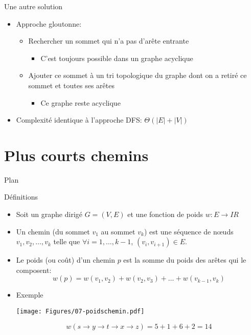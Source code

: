 \begin{frame}{Une autre solution}

\begin{itemize}
\item Approche gloutonne:
\begin{itemize}
\item Rechercher un sommet qui n'a pas d'arête entrante
\begin{itemize}
\item C'est toujours possible dans un graphe acyclique
\end{itemize}
\item Ajouter ce sommet à un tri topologique du graphe dont on a retiré ce sommet et toutes ses arêtes
\begin{itemize}
\item Ce graphe reste acyclique
\end{itemize}
\end{itemize}
\item Complexité identique à l'approche DFS: $\Theta(|E|+|V|)$
\end{itemize}

\end{frame}


\section{Plus courts chemins}

\begin{frame}{Plan}

\tableofcontents[currentsection]

\end{frame}


\begin{frame}{Définitions}

\begin{itemize}
\item Soit un graphe dirigé $G=(V,E)$ et une fonction de poids $w:
  E\rightarrow I\!R$
\item Un chemin (du sommet $v_1$ au sommet $v_k$) est une séquence de
  n\oe uds $v_1, v_2,\ldots, v_k$ telle que $\forall i=1,\ldots,k-1$,
  $(v_i,v_{i+1})\in E$.
\item Le poids (ou coût) d'un chemin $p$ est la somme du poids des arêtes qui le composent:
$$w(p)=w(v_1,v_2)+w(v_2,v_3)+\ldots+w(v_{k-1},v_k)$$
\item Exemple
\centerline{\texttt{[image: Figures/07-poidschemin.pdf]}}
$$w(s\rightarrow y \rightarrow t\rightarrow x\rightarrow z)=5+1+6+2=14$$
\end{itemize}

\end{frame}

